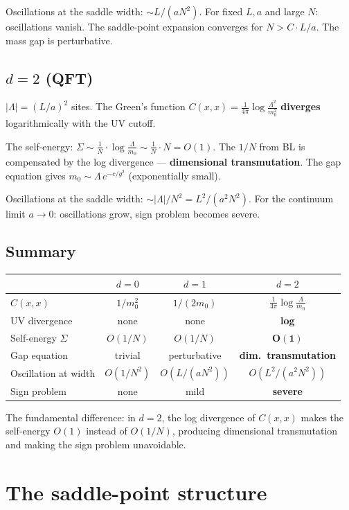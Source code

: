 \documentclass[12pt]{article}
\theoremstyle{definition}
\theoremstyle{remark}
\newcommand{\La}{\Lambda}
\begin{document}
Oscillations at the saddle width: $\sim L/(aN^2)$.
For fixed $L, a$ and large $N$: oscillations vanish.
The saddle-point expansion converges for $N > C\cdot L/a$.
The mass gap is perturbative.

\subsection{$d = 2$ (QFT)}

$|\La| = (L/a)^2$ sites. The Green's function
$C(x,x) = \frac{1}{4\pi}\log\frac{\La^2}{m_0^2}$ \textbf{diverges}
logarithmically with the UV cutoff.

The self-energy:
$\Sigma \sim \frac{1}{N}\cdot\log\frac{\La}{m_0} \sim \frac{1}{N}\cdot N = O(1)$.
The $1/N$ from BL is compensated by the log divergence ---
\textbf{dimensional transmutation}. The gap equation gives
$m_0 \sim \La\,e^{-c/g^2}$ (exponentially small).

Oscillations at the saddle width: $\sim |\La|/N^2 = L^2/(a^2 N^2)$.
For the continuum limit $a \to 0$: oscillations grow, sign problem
becomes severe.

\subsection{Summary}

\begin{center}
\begin{tabular}{|l|c|c|c|}
\hline
& $d=0$ & $d=1$ & $d=2$ \\
\hline
$C(x,x)$ & $1/m_0^2$ & $1/(2m_0)$ & $\frac{1}{4\pi}\log\frac{\La}{m_0}$ \\
UV divergence & none & none & \textbf{log} \\
Self-energy $\Sigma$ & $O(1/N)$ & $O(1/N)$ & $\mathbf{O(1)}$ \\
Gap equation & trivial & perturbative & \textbf{dim.\ transmutation} \\
Oscillation at width & $O(1/N^2)$ & $O(L/(aN^2))$ & $O(L^2/(a^2N^2))$ \\
Sign problem & none & mild & \textbf{severe} \\
\hline
\end{tabular}
\end{center}

The fundamental difference: in $d=2$, the log divergence of $C(x,x)$
makes the self-energy $O(1)$ instead of $O(1/N)$, producing dimensional
transmutation and making the sign problem unavoidable.

\section{The saddle-point structure}
\end{document}
